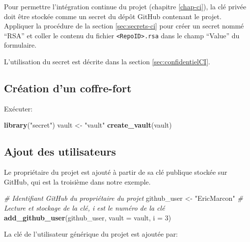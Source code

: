 \documentclass[
  12pt,
  french,
  a4paper,
  extrafontsizes,onecolumn,openright
  ]{memoir}
\newenvironment{Shaded}{\begin{snugshade}}{\end{snugshade}}
\newcommand{\AttributeTok}[1]{\textcolor[rgb]{0.13,0.29,0.53}{#1}}
\newcommand{\CommentTok}[1]{\textcolor[rgb]{0.56,0.35,0.01}{\textit{#1}}}
\newcommand{\DecValTok}[1]{\textcolor[rgb]{0.00,0.00,0.81}{#1}}
\newcommand{\FunctionTok}[1]{\textcolor[rgb]{0.13,0.29,0.53}{\textbf{#1}}}
\newcommand{\NormalTok}[1]{#1}
\newcommand{\OtherTok}[1]{\textcolor[rgb]{0.56,0.35,0.01}{#1}}
\newcommand{\StringTok}[1]{\textcolor[rgb]{0.31,0.60,0.02}{#1}}
\begin{document}
Pour permettre l'intégration continue du projet (chapitre \ref{chap-ci}), la clé privée doit être stockée comme un secret du dépôt GitHub contenant le projet.
Appliquer la procédure de la section \ref{sec:secrets-ci} pour créer un secret nommé \enquote{RSA} et coller le contenu du fichier \texttt{\textless{}RepoID\textgreater{}.rsa} dans le champ \enquote{Value} du formulaire.

L'utilisation du secret est décrite dans la section \ref{sec:confidentielCI}.

\subsection{Création d'un coffre-fort}\label{cruxe9ation-dun-coffre-fort}

Exécuter:

\scriptsize

\begin{Shaded}
\begin{Highlighting}[]
\FunctionTok{library}\NormalTok{(}\StringTok{"secret"}\NormalTok{)}
\NormalTok{vault }\OtherTok{\textless{}{-}} \StringTok{"vault"}
\FunctionTok{create\_vault}\NormalTok{(vault)}
\end{Highlighting}
\end{Shaded}

\normalsize

\subsection{Ajout des utilisateurs}\label{ajout-des-utilisateurs}

Le propriétaire du projet est ajouté à partir de sa clé publique stockée sur GitHub, qui est la troisième dans notre exemple.

\scriptsize

\begin{Shaded}
\begin{Highlighting}[]
\CommentTok{\# Identifiant GitHub du propriétaire du projet}
\NormalTok{github\_user }\OtherTok{\textless{}{-}} \StringTok{"EricMarcon"}
\CommentTok{\# Lecture et stockage de la clé, i est le numéro de la clé}
\FunctionTok{add\_github\_user}\NormalTok{(github\_user, }\AttributeTok{vault =}\NormalTok{ vault, }\AttributeTok{i =} \DecValTok{3}\NormalTok{)}
\end{Highlighting}
\end{Shaded}

\normalsize

La clé de l'utilisateur générique du projet est ajoutée par:
\end{document}
